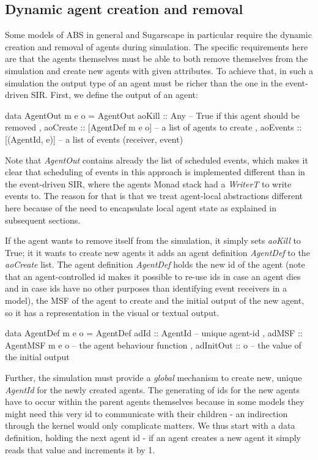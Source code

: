 \subsection{Dynamic agent creation and removal}
Some models of ABS in general and Sugarscape in particular require the dynamic creation and removal of agents during simulation. The specific requirements here are that the agents themselves must be able to both remove themselves from the simulation and create new agents with given attributes. To achieve that, in such a simulation the output type of an agent must be richer than the one in the event-driven SIR. First, we define the output of an agent:

\begin{HaskellCode}
data AgentOut m e o = AgentOut
  { aoKill   :: Any              -- True if this agent should be removed 
  , aoCreate :: [AgentDef m e o] -- a list of agents to create
  , aoEvents :: [(AgentId, e)]   -- a list of events (receiver, event)
  }
\end{HaskellCode}

Note that \textit{AgentOut} contains already the list of scheduled events, which makes it clear that scheduling of events in this approach is implemented different than in the event-driven SIR, where the agents Monad stack had a \textit{WriterT} to write events to. The reason for that is that we treat agent-local abstractions different here because of the need to encapsulate local agent state as explained in subsequent sections.

If the agent wants to remove itself from the simulation, it simply sets \textit{aoKill} to True; it it wants to create new agents it adds an agent definition \textit{AgentDef} to the \textit{aoCreate} list. The agent definition \textit{AgentDef} holds the new id of the agent (note that an agent-controlled id makes it possible to re-use ids in case an agent dies and in case ids have no other purposes than identifying event receivers in a model), the MSF of the agent to create and the initial output of the new agent, so it has a representation in the visual or textual output.

\begin{HaskellCode}
data AgentDef m e o = AgentDef
  { adId      :: AgentId         -- unique agent-id
  , adMSF     :: AgentMSF m e o  -- the agent behaviour function
  , adInitOut :: o               -- the value of the initial output
  }
\end{HaskellCode}

Further, the simulation must provide a \textit{global} mechanism to create new, unique \textit{AgentId} for the newly created agents. The generating of ids for the new agents have to occur within the parent agents themselves because in some models they might need this very id to communicate with their children - an indirection through the kernel would only complicate matters. We thus start with a data definition, holding the next agent id - if an agent creates a new agent it simply reads that value and increments it by 1.

